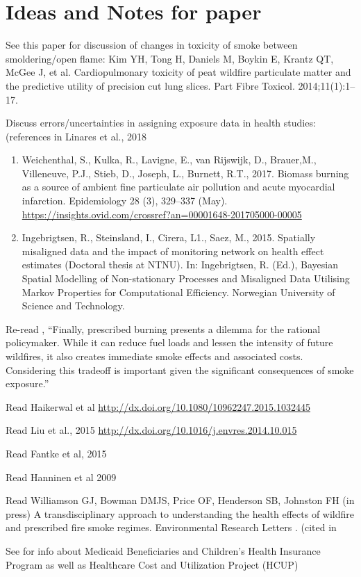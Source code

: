 \section{Ideas and Notes for paper}

See this paper for discussion of changes in toxicity of smoke between smoldering/open flame: Kim YH, Tong H, Daniels M, Boykin E, Krantz QT, McGee J, et al.
Cardiopulmonary toxicity of peat wildfire particulate matter and the predictive
utility of precision cut lung slices. Part Fibre Toxicol. 2014;11(1):1–17.

Discuss errors/uncertainties in assigning exposure data in health studies: (references in Linares et al., 2018 \cite{linares_impact_2018}
\begin{enumerate}
\item Weichenthal, S., Kulka, R., Lavigne, E., van Rijswijk, D., Brauer,M., Villeneuve, P.J., Stieb, D.,
Joseph, L., Burnett, R.T., 2017. Biomass burning as a source of ambient fine particulate
air pollution and acute myocardial infarction. Epidemiology 28 (3), 329–337 (May). \url{https://insights.ovid.com/crossref?an=00001648-201705000-00005}

\item Ingebrigtsen, R., Steinsland, I., Cirera, L1., Saez, M., 2015. Spatially misaligned data and the
impact of monitoring network on health effect estimates (Doctoral thesis at NTNU).
In: Ingebrigtsen, R. (Ed.), Bayesian Spatial Modelling of Non-stationary Processes
and Misaligned Data Utilising Markov Properties for Computational Efficiency. Norwegian
University of Science and Technology. 
\end{enumerate}

Re-read \cite{jones_application_2017}, ``Finally, prescribed burning presents a dilemma for the rational policymaker. While it can reduce fuel loads and lessen the intensity of future wildfires, it also creates immediate smoke effects and associated costs. Considering this tradeoff is important given the significant consequences of smoke exposure.''

Read Haikerwal et al \url{http://dx.doi.org/10.1080/10962247.2015.1032445}

Read Liu et al., 2015 \url{http://dx.doi.org/10.1016/j.envres.2014.10.015}

Read Fantke et al, 2015 \cite{http://dx.doi.org/10.1007/s11367-014-0822-2}

Read Hanninen et al 2009 \cite{http://dx.doi.org/10.1038/jes.2008.31}

Read Williamson GJ, Bowman DMJS, Price OF, Henderson SB, Johnston FH (in press) A transdisciplinary approach to understanding the health effects of wildfire and prescribed fire smoke regimes. Environmental Research Letters . (cited in \cite{hyde_air_2017}

See \cite{vaidyanathan_developing_2018} for info about Medicaid Beneficiaries and Children's Health Insurance Program as well as Healthcare Cost and Utilization Project (HCUP)